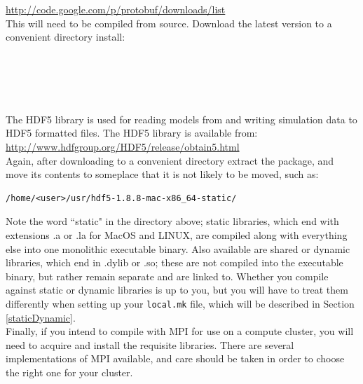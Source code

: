 \url{http://code.google.com/p/protobuf/downloads/list}\\

This will need to be compiled from source.  Download the latest version to a convenient directory install:\\

\\
\\
\\
\\
\\


The HDF5 library is used for reading models from and writing simulation data to HDF5 formatted files.  The HDF5 library is available from: \\

\url{http://www.hdfgroup.org/HDF5/release/obtain5.html}\\

Again, after downloading to a convenient directory extract the package, and move its contents to someplace that it is not likely to be moved, such as:\\
{\small\begin{verbatim}
/home/<user>/usr/hdf5-1.8.8-mac-x86_64-static/
\end{verbatim}}

Note the word ``static" in the directory above; static libraries, which end with extensions .a or .la for MacOS and LINUX, are compiled along with everything else into one monolithic executable binary.  Also available are shared or dynamic libraries, which end in .dylib or .so; these are not compiled into the executable binary, but rather remain separate and are linked to.  Whether you compile against static or dynamic libraries is up to you, but you will have to treat them differently when setting up your \texttt{local.mk} file, which will be described in Section \ref{staticDynamic}.\\

Finally, if you intend to compile with MPI for use on a compute cluster, you will need to acquire and install the requisite libraries.  There are several implementations of MPI available, and care should be taken in order to choose the right one for your cluster.

